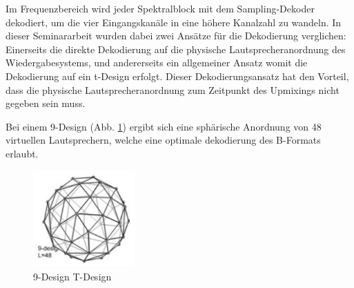 


Im Frequenzbereich wird jeder Spektralblock mit dem Sampling-Dekoder dekodiert, um die vier Eingangskanäle in eine höhere Kanalzahl zu wandeln.
In dieser Seminararbeit wurden dabei zwei Ansätze für die Dekodierung verglichen: Einerseits die direkte Dekodierung auf die physische Lautsprecheranordnung des Wiedergabesystems, und andererseits ein allgemeiner Ansatz womit die Dekodierung auf ein t-Design erfolgt. Dieser Dekodierungsansatz hat den Vorteil, dass die physische Lautsprecheranordnung zum Zeitpunkt des Upmixings nicht gegeben sein muss.

Bei einem 9-Design (Abb. \ref{fig:tdesign_image}) ergibt sich eine sphärische Anordnung von 48 virtuellen Lautsprechern, welche eine optimale dekodierung des B-Formats erlaubt.

\begin{figure}[!ht]
  \centering
  \includegraphics[width=0.35\textwidth]{implementierung/plots/t-design.png}
  \caption{9-Design T-Design \cite{ambi-book}}
  \label{fig:tdesign_image}
\end{figure}

